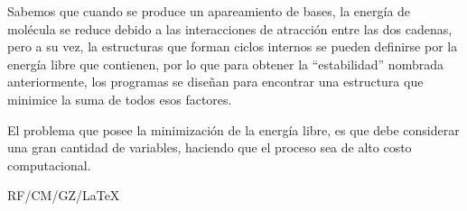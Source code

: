 \documentclass[letter, 10pt]{article}
\begin{document}
\begin{itemize}
Sabemos que cuando se produce un apareamiento de bases,
la energía de molécula se reduce debido a las interacciones de atracción entre
las dos cadenas, pero a su vez, la estructuras que forman ciclos internos se
pueden definirse por la energía libre que contienen, por lo que para obtener la ``estabilidad'' nombrada anteriormente,
los programas se diseñan para encontrar una estructura que minimice la suma de
todos esos factores.

El problema que posee la minimización de la energía libre, es que debe considerar
una gran cantidad de variables, 
haciendo que el proceso sea de alto costo computacional.

\end{itemize}



\vfill\hfill
RF/CM/GZ/\LaTeX
\end{document}
